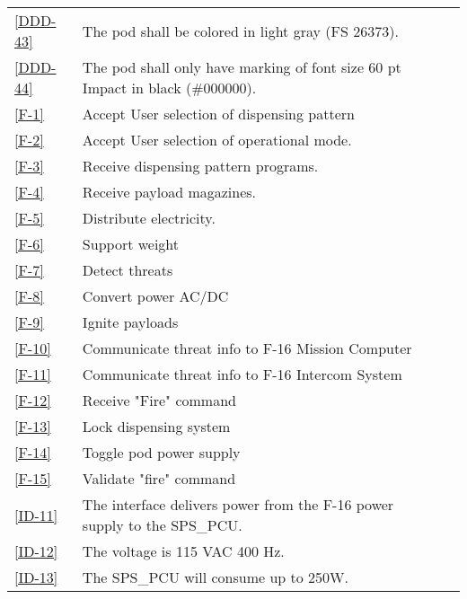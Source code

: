 \documentclass[Main]{subfiles}
\begin{document}
\begin{longtable}{l p{10.4cm} p{1.8cm} }
\ref{DDD-43} & The pod shall be colored in light gray (FS 26373). & \\

\ref{DDD-44} & The pod shall only have marking of font size 60 pt Impact in black (\#000000). & \\

\ref{F-1} & Accept User selection of dispensing pattern & \\

\ref{F-2} & Accept User selection of operational mode.& \\

\ref{F-3} & Receive dispensing pattern programs.& \\

\ref{F-4} & Receive payload magazines. & \\

\ref{F-5} & Distribute electricity.& \\

\ref{F-6} & Support weight& \\

\ref{F-7} & Detect threats& \\

\ref{F-8} & Convert power AC/DC& \\

\ref{F-9} & Ignite payloads& \\

\ref{F-10} & Communicate threat info to F-16 Mission Computer& \\

\ref{F-11} & Communicate threat info to F-16 Intercom System& \\

\ref{F-12} & Receive "Fire" command& \\

\ref{F-13} & Lock dispensing system& \\

\ref{F-14} & Toggle pod power supply& \\

\ref{F-15} & Validate "fire" command& \\


\ref{ID-11} & The interface delivers power from the F-16 power supply to the SPS\_PCU.& \\

\ref{ID-12} & The voltage is 115 VAC 400 Hz.& \\

\ref{ID-13} & The SPS\_PCU will consume up to 250W. & \\


\end{longtable}
\end{document}
